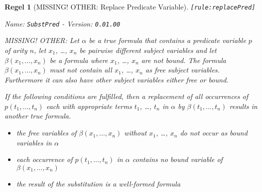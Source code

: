 \documentclass[a4paper,german,10pt,twoside]{book}
\newtheorem{rul}{Regel}
\theoremstyle{definition}
\theoremstyle{remark}
\begin{document}
\begin{rul}[MISSING! OTHER: Replace Predicate Variable]
\label{rule:replacePred} \hypertarget{rule:replacePred}{}
{\tt \tiny [\verb]rule:replacePred]]}

\par
{\em   Name: \verb]SubstPred]  -  Version: \verb]0.01.00]}


MISSING! OTHER: Let $\alpha$ be a true formula that contains a predicate variable $p$ of arity $n$, let $x_1$, \ldots, $x_n$ be pairwise different subject variables and let $\beta(x_1, \ldots, x_n)$ be a formula where $x_1$, \ldots, $x_n$ are not bound. The formula $\beta(x_1, \ldots, x_n)$ must not contain all $x_1$, \ldots, $x_n$ as free subject variables. Furthermore it can also have other subject variables either free or bound.

If the following conditions are fulfilled, then a replacement of all occurrences of $p(t_1, \ldots, t_n)$ each with appropriate terms $t_1$, \ldots, $t_n$ in $\alpha$ by $\beta(t_1, \ldots, t_n)$ results in another true formula.

\begin{itemize}

\item
the free variables of $\beta(x_1, \ldots, x_n)$ without $x_1$, \ldots, $x_n$ do not occur as bound variables in $\alpha$ 

\item 
each occurrence of $p(t_1, \ldots, t_n)$ in $\alpha$ contains no bound variable of $\beta(x_1, \ldots, x_n)$ 

\item
the result of the substitution is a well-formed formula

\end{itemize}
\end{rul}
\end{document}
